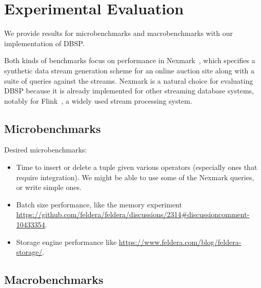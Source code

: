 \section{Experimental Evaluation}\label{sec:experiments}

We provide results for microbenchmarks and macrobenchmarks with our
implementation of DBSP.

Both kinds of benchmarks focus on performance in
Nexmark~\cite{tucker2008nexmark}, which specifies a synthetic data
stream generation scheme for an online auction site along with a suite
of queries against the streams.  Nexmark is a natural choice for
evaluating DBSP because it is already implemented for other streaming
database systems, notably for Flink~\cite{carbone-ieee15,
  nexmark-flink}, a widely used stream processing system.

\subsection{Microbenchmarks}

Desired microbenchmarks:

\begin{itemize}
\item Time to insert or delete a tuple given various operators
  (especially ones that require integration).  We might be able to use
  some of the Nexmark queries, or write simple ones.

\item Batch size performance, like the memory experiment
  \url{https://github.com/feldera/feldera/discussions/2314#discussioncomment-10433354}.

\item Storage engine performance like
  \url{https://www.feldera.com/blog/feldera-storage/}.
\end{itemize}

\subsection{Macrobenchmarks}

